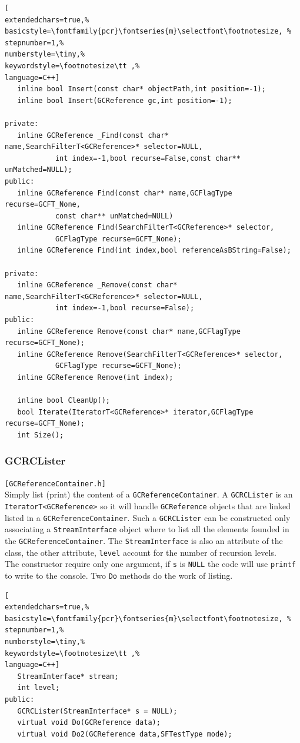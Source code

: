 \begin{lstlisting}[
extendedchars=true,%
basicstyle=\fontfamily{pcr}\fontseries{m}\selectfont\footnotesize, %
stepnumber=1,%
numberstyle=\tiny,%
keywordstyle=\footnotesize\tt ,%
language=C++]
   inline bool Insert(const char* objectPath,int position=-1);
   inline bool Insert(GCReference gc,int position=-1);

private:
   inline GCReference _Find(const char* name,SearchFilterT<GCReference>* selector=NULL,
            int index=-1,bool recurse=False,const char** unMatched=NULL);
public:
   inline GCReference Find(const char* name,GCFlagType recurse=GCFT_None,
            const char** unMatched=NULL)
   inline GCReference Find(SearchFilterT<GCReference>* selector,
            GCFlagType recurse=GCFT_None);
   inline GCReference Find(int index,bool referenceAsBString=False);

private:
   inline GCReference _Remove(const char* name,SearchFilterT<GCReference>* selector=NULL,
            int index=-1,bool recurse=False);
public:
   inline GCReference Remove(const char* name,GCFlagType recurse=GCFT_None);
   inline GCReference Remove(SearchFilterT<GCReference>* selector,
            GCFlagType recurse=GCFT_None);
   inline GCReference Remove(int index);

   inline bool CleanUp();
   bool Iterate(IteratorT<GCReference>* iterator,GCFlagType recurse=GCFT_None);
   int Size();
\end{lstlisting}



\subsubsection{GCRCLister}
\texttt{[GCReferenceContainer.h]}\\
Simply list (print) the content of a \texttt{GCReferenceContainer}. A \texttt{GCRCLister} is an \texttt{IteratorT<GCReference>} so it will handle \texttt{GCReference} objects that are linked listed in a \texttt{GCReferenceContainer}. Such a \texttt{GCRCLister} can be constructed only associating a \texttt{StreamInterface} object where to list all the elements founded in the \texttt{GCReferenceContainer}. The \texttt{StreamInterface} is also an attribute of the class, the other attribute, \texttt{level} account for the number of recursion levels. \\


The constructor require only one argument, if \texttt{s} is \texttt{NULL} the code will use \texttt{printf} to write to the console. Two \texttt{Do} methods do the work of listing.
\begin{lstlisting}[
extendedchars=true,%
basicstyle=\fontfamily{pcr}\fontseries{m}\selectfont\footnotesize, %
stepnumber=1,%
numberstyle=\tiny,%
keywordstyle=\footnotesize\tt ,%
language=C++]
   StreamInterface* stream;
   int level;
public:
   GCRCLister(StreamInterface* s = NULL);
   virtual void Do(GCReference data);
   virtual void Do2(GCReference data,SFTestType mode);
\end{lstlisting}



